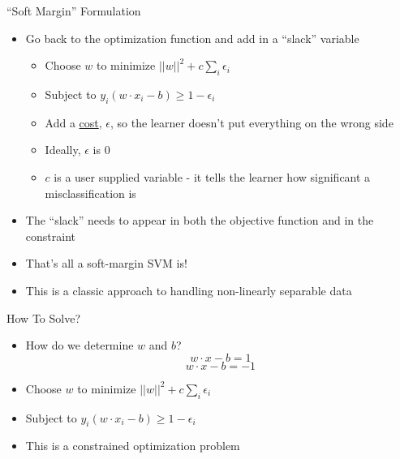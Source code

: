 \documentclass[aspectratio=169]{beamer}
\begin{document}
\begin{frame}{``Soft Margin'' Formulation}

\begin{itemize}
\item Go back to the optimization function and add in a ``slack'' variable
\begin{itemize}
\item Choose $w$ to minimize $||w||^2 + c \sum_i \epsilon_i$
\item Subject to $y_i (w \cdot x_i - b) \geq 1 - \epsilon_i$
\item Add a \underline{cost}, $\epsilon$, so the learner doesn't put everything on the wrong side
\item Ideally, $\epsilon$ is 0
\item $c$ is a user supplied variable - it tells the learner how significant a misclassification is
\end{itemize}
\item The ``slack'' needs to appear in both the objective function and in the constraint
\item That's all a soft-margin SVM is!
\vspace{1em}
\item This is a classic approach to handling non-linearly separable data
\end{itemize}
\end{frame}
\begin{frame}{How To Solve?}

\begin{itemize}
\item How do we determine $w$ and $b$?
$$w \cdot x - b = 1$$ 
$$w \cdot x - b = -1$$ 
\item Choose $w$ to minimize $||w||^2 + c \sum_i \epsilon_i$
\item Subject to $y_i (w \cdot x_i - b) \geq 1 - \epsilon_i$

\item This is a constrained optimization problem
\end{itemize}
\end{frame}
\end{document}
